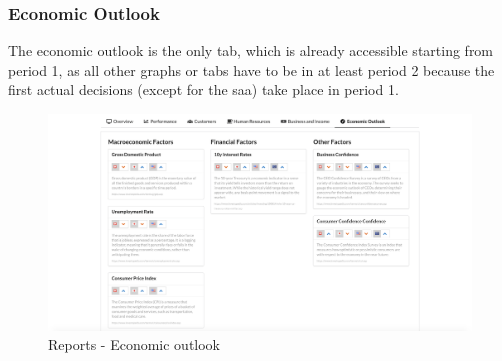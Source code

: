 \subsubsection{Economic Outlook}
The economic outlook is the only tab, which is already accessible starting from period 1, as all other graphs or tabs have to be in at least period 2 because the first actual decisions (except for the saa) take place in period 1.
\begin{figure}[h!]
  \centering
  \includegraphics[scale=0.2]{img/application-overview/reports/06_economic_outlook.png}
  \caption{Reports - Economic outlook}
\end{figure}
